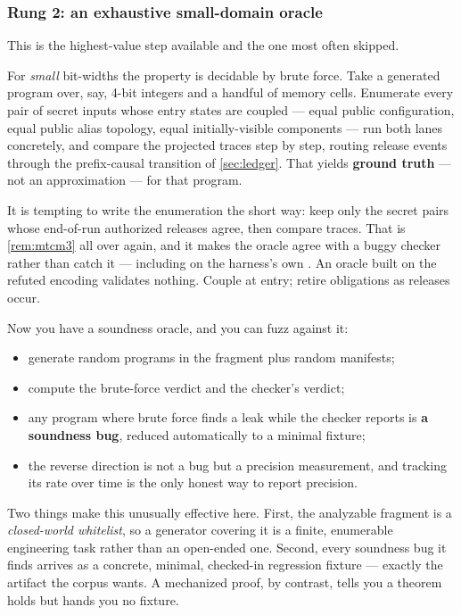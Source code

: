 \subsubsection*{Rung 2: an exhaustive small-domain oracle}

This is the highest-value step available and the one most often skipped.

For \emph{small} bit-widths the property is decidable by brute force. Take a
generated program over, say, 4-bit integers and a handful of memory cells.
Enumerate every pair of secret inputs whose entry states are coupled --- equal
public configuration, equal public alias topology, equal initially-visible
components --- run both lanes concretely, and compare the projected traces step by
step, routing release events through the prefix-causal transition of
\cref{sec:ledger}. That yields \textbf{ground truth} --- not an approximation ---
for that program.

\begin{remark}
It is tempting to write the enumeration the short way: keep only the secret pairs
whose end-of-run authorized releases agree, then compare traces. That is
\cref{rem:mtcm3} all over again, and it makes the oracle agree with a buggy
checker rather than catch it --- including on the harness's own
. An oracle built on the refuted encoding
validates nothing. Couple at entry; retire obligations as releases occur.
\end{remark}

Now you have a soundness oracle, and you can fuzz against it:

\begin{itemize}[nosep,leftmargin=1.4em]
\item generate random programs in the fragment plus random manifests;
\item compute the brute-force verdict and the checker's verdict;
\item any program where brute force finds a leak while the checker reports
      \Verified{} is \textbf{a soundness bug}, reduced automatically to a minimal
      fixture;
\item the reverse direction is not a bug but a precision measurement, and
      tracking its rate over time is the only honest way to report precision.
\end{itemize}

Two things make this unusually effective here. First, the analyzable fragment is
a \emph{closed-world whitelist}, so a generator covering it is a finite,
enumerable engineering task rather than an open-ended one. Second, every
soundness bug it finds arrives as a concrete, minimal, checked-in regression
fixture --- exactly the artifact the corpus wants. A mechanized proof, by
contrast, tells you a theorem holds but hands you no fixture.

